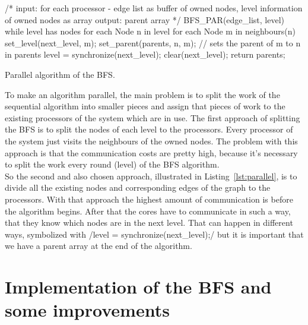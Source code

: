 \documentclass[12pt,a4paper]{article}
\begin{document}
\begin{listing}[h]
\begin{ccode}
/*
input: for each processor - edge list as buffer of owned nodes, level information of owned nodes as array
output: parent array
*/
BFS_PAR(edge_list, level){
	while level has nodes {
		for each Node n in level {
			for each Node m in neighbours(n){
				set_level(next_level, m);
				set_parent(parents, n, m); // sets the parent of m to n in parents
			}
		}
		level = synchronize(next_level);
		clear(next_level);
	}
	return parents;
}
\end{ccode}
\caption{Parallel algorithm of the BFS.}
\label{lst:parallel}
\end{listing}

To make an algorithm parallel, the main problem is to split the work of the sequential algorithm into smaller pieces and assign that pieces of work to the existing processors of the system which are in use.  The first approach of splitting the BFS is to split the nodes of each level to the processors. Every processor of the system just visits the neighbours of the owned nodes. The problem with this approach is that the communication costs are pretty high, because it's necessary to split the work every round (level) of the BFS algorithm.\\
So the second and also chosen approach, illustrated in Listing~\ref{lst:parallel}, is to divide all the existing nodes and corresponding edges of the graph to the processors. With that approach the highest amount of communication is before the algorithm begins. After that the cores have to communicate in such a way, that they know which nodes are in the next level. That can happen in different ways, symbolized with \cinline/level = synchronize(next_level);/ but it is important that we have a parent array at the end of the algorithm. 

\section{Implementation of the BFS and some improvements}
\label{sec:implementations}
\end{document}

